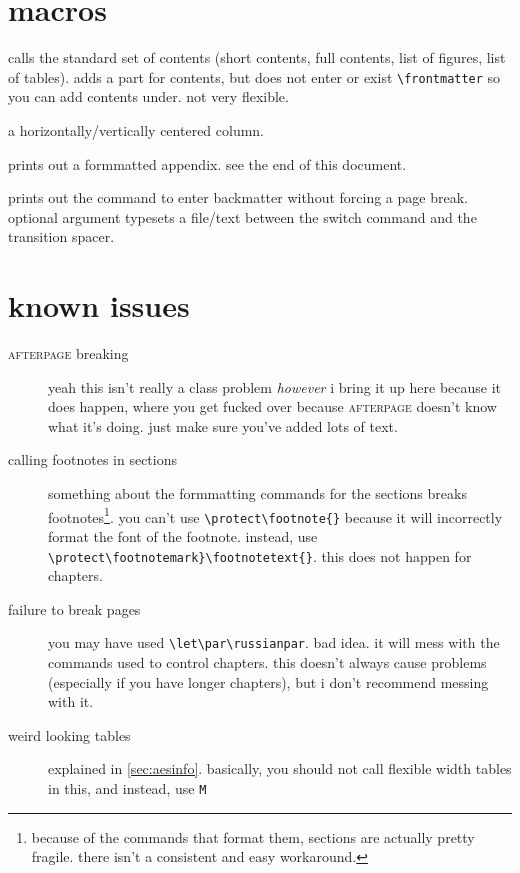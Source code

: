 \documentclass[lowerhead,12pt]{aesthetic}
\begin{document}
\section{macros}\label{sec:macro}
\begin{description}[font=\ttfamily]
    \item[\textbackslash contents] calls the standard set of contents (short contents, full contents, list of figures, list of tables). adds a part for contents, but does not enter or exist \verb|\frontmatter| so you can add contents under. not very flexible.
    \item[M\{<width>\}] a horizontally/vertically centered column.
    \item[\textbackslash makeappendix] prints out a formmatted appendix. see the end of this document.
    \item[\textbackslash makebackmatter{[]}] prints out the command to enter backmatter without forcing a page break. optional argument typesets a file/text between the switch command and the transition spacer.
\end{description}

\section{known issues}
\begin{description}
    \item[{\scshape\ttfamily afterpage} breaking] yeah this isn't really a class problem \emph{however} i bring it up here because it does happen, where you get fucked over because {\scshape\ttfamily afterpage} doesn't know what it's doing. just make sure you've added lots of text.
    \item[calling footnotes in sections] something about the formmatting commands for the sections breaks footnotes\footnote{because of the commands that format them, sections are actually pretty fragile. there isn't a consistent and easy workaround.}. you can't use \verb|\protect\footnote{}| because it will incorrectly format the font of the footnote. instead, use \verb|\protect\footnotemark}\footnotetext{}|. this does not happen for chapters.
    \item[failure to break pages] you may have used \verb|\let\par\russianpar|. bad idea. it will mess with the commands used to control chapters. this doesn't always cause problems (especially if you have longer chapters), but i don't recommend messing with it.
    \item[weird looking tables] explained in \vref{sec:aesinfo}. basically, you should not call flexible width tables in this, and instead, use \texttt{M}
\end{description}
\end{document}
